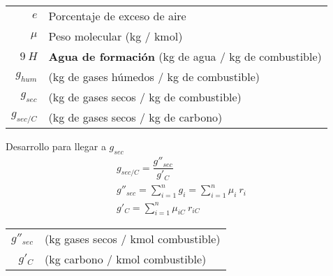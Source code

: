 \documentclass[11pt,a4paper]{article}
\begin{document}
	\begin{cajita}
		
		\begin{multicols}{2}
				\\[.2cm]
				
				\\[.2cm]
				
				\\[.2cm]
				
				\\[.2cm]
				
				\columnbreak
				
				\begin{tabular}{r p{.9\linewidth}}
					$e$ & Porcentaje de exceso de aire\\
					$\mu$ & Peso molecular (kg / kmol)\\[.1cm]
					$9\ H$ & \textbf{Agua de formación} (kg de agua / kg de combustible)\\
					$g_{hum}$ & (kg de gases húmedos / kg de combustible)\\
					$g_{sec}$ & (kg de gases secos / kg de combustible)\\
					$g_{sec/C}$ & (kg de gases secos / kg de carbono)\\
				\end{tabular}
		\end{multicols}
	
		
		\begin{multicols}{2}
			Desarrollo para llegar a $g_{sec}$
			\begin{gather*}
				g_{sec/C} = \dfrac{g''_{sec}}{g'_{C}}\\
				g''_{sec} = \sum_{i=1}^{n} g_i = \sum_{i=1}^{n} \mu_i~r_i\\
				g'_{C} = \sum_{i=1}^{n} \mu_{iC}~r_{iC}
			\end{gather*}
		
			\begin{tabular}{r p{0.87\textwidth}}
				$g''_{sec}$ & (kg gases secos / kmol combustible)\\
				$g'_{C}$ & (kg carbono / kmol combustible)\\
			\end{tabular}
		
		\end{multicols}
	
	\end{cajita}
		
\end{document}
